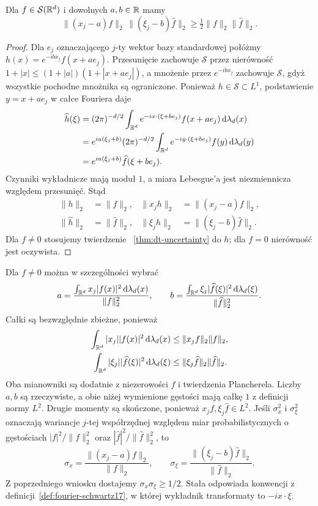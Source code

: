 \begin{wniosek}
Dla $f\in\mathcal S(\mathbb R^d)$ i dowolnych $a,b\in\mathbb R$
mamy
\[
 \|(x_j-a)f\|_2\,\|(\xi_j-b)\widehat f\|_2
 \ge\tfrac12\|f\|_2\|\widehat f\|_2.
\]
\end{wniosek}
\begin{proof}
Dla $e_j$ oznaczającego $j$-ty wektor
bazy standardowej połóżmy
$h(x)=e^{-ibx_j}f(x+ae_j)$.
Przesunięcie zachowuje $\mathcal S$ przez
nierówność $1+|x|\le(1+|a|)(1+|x+ae_j|)$,
a mnożenie przez $e^{-ibx_j}$ zachowuje
$\mathcal S$, gdyż wszystkie pochodne
mnożnika są ograniczone.
Ponieważ $h\in\mathcal S\subset L^1$,
podstawienie $y=x+ae_j$ w całce Fouriera daje
\[
 \begin{aligned}
 \widehat h(\xi)
 &=(2\pi)^{-d/2}\int_{\mathbb R^d}e^{-ix\cdot(\xi+be_j)}
 f(x+ae_j)\,\mathrm d\lambda_d(x)\\
 &=e^{ia(\xi_j+b)}(2\pi)^{-d/2}
 \int_{\mathbb R^d}e^{-iy\cdot(\xi+be_j)}f(y)
 \,\mathrm d\lambda_d(y)\\
 &=e^{ia(\xi_j+b)}\widehat f(\xi+be_j).
 \end{aligned}
\]
Czynniki wykładnicze mają moduł $1$,
a miara Lebesgue'a jest niezmiennicza
względem przesunięć. Stąd
\[
 \begin{aligned}
 \|h\|_2&=\|f\|_2,&
 \|x_jh\|_2&=\|(x_j-a)f\|_2,\\
 \|\widehat h\|_2&=\|\widehat f\|_2,&
 \|\xi_j\widehat h\|_2&=\|(\xi_j-b)\widehat f\|_2.
 \end{aligned}
\]
Dla $f\ne0$ stosujemy twierdzenie
~\ref{thm:dt-uncertainty} do $h$;
dla $f=0$ nierówność jest oczywista.
\end{proof}

Dla $f\ne0$ można w szczególności wybrać
\[
 a=\frac{\int_{\mathbb R^d}x_j|f(x)|^2\,
 \mathrm d\lambda_d(x)}{\|f\|_2^2},
 \qquad
 b=\frac{\int_{\mathbb R^d}\xi_j|\widehat f(\xi)|^2\,
 \mathrm d\lambda_d(\xi)}{\|\widehat f\|_2^2}.
\]
Całki są bezwzględnie zbieżne, ponieważ
\[
 \begin{aligned}
 \int_{\mathbb R^d}|x_j||f(x)|^2\,\mathrm d\lambda_d(x)
 &\le\|x_jf\|_2\|f\|_2,\\
 \int_{\mathbb R^d}|\xi_j||\widehat f(\xi)|^2\,
 \mathrm d\lambda_d(\xi)
 &\le\|\xi_j\widehat f\|_2\|\widehat f\|_2.
 \end{aligned}
\]
Oba mianowniki są dodatnie z niezerowości $f$
i twierdzenia Plancherela. Liczby $a,b$ są
rzeczywiste, a obie niżej wymienione gęstości
mają całkę $1$ z definicji normy $L^2$.
Drugie momenty są skończone, ponieważ
$x_jf,\xi_j\widehat f\in L^2$.
Jeśli $\sigma_x^2$ i $\sigma_\xi^2$
oznaczają wariancje $j$-tej współrzędnej
względem miar probabilistycznych o gęstościach
$|f|^2/\|f\|_2^2$ oraz
$|\widehat f|^2/\|\widehat f\|_2^2$, to
\[
 \sigma_x=\frac{\|(x_j-a)f\|_2}{\|f\|_2},
 \qquad
 \sigma_\xi=\frac{\|(\xi_j-b)\widehat f\|_2}
 {\|\widehat f\|_2}.
\]
Z poprzedniego wniosku dostajemy
$\sigma_x\sigma_\xi\ge1/2$.
Stała odpowiada konwencji z definicji~\ref{def:fourier-schwartz17},
w której wykładnik transformaty to $-ix\cdot\xi$.
